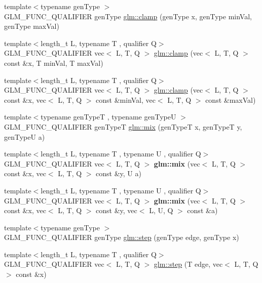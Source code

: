 \begin{DoxyCompactItemize}
\item 
{\footnotesize template$<$typename gen\+Type $>$ }\\G\+L\+M\+\_\+\+F\+U\+N\+C\+\_\+\+Q\+U\+A\+L\+I\+F\+I\+ER gen\+Type \hyperlink{group__core__func__common_ga93bce26c7d80d30a62f5c508f8498a6c}{glm\+::clamp} (gen\+Type x, gen\+Type min\+Val, gen\+Type max\+Val)
\item 
{\footnotesize template$<$length\+\_\+t L, typename T , qualifier Q$>$ }\\G\+L\+M\+\_\+\+F\+U\+N\+C\+\_\+\+Q\+U\+A\+L\+I\+F\+I\+ER vec$<$ L, T, Q $>$ \hyperlink{group__core__func__common_gabff13e6547edac08f52b4133ff4bf183}{glm\+::clamp} (vec$<$ L, T, Q $>$ const \&x, T min\+Val, T max\+Val)
\item 
{\footnotesize template$<$length\+\_\+t L, typename T , qualifier Q$>$ }\\G\+L\+M\+\_\+\+F\+U\+N\+C\+\_\+\+Q\+U\+A\+L\+I\+F\+I\+ER vec$<$ L, T, Q $>$ \hyperlink{group__core__func__common_ga748333282a6f2f87762c0a4739c8c364}{glm\+::clamp} (vec$<$ L, T, Q $>$ const \&x, vec$<$ L, T, Q $>$ const \&min\+Val, vec$<$ L, T, Q $>$ const \&max\+Val)
\item 
{\footnotesize template$<$typename gen\+TypeT , typename gen\+TypeU $>$ }\\G\+L\+M\+\_\+\+F\+U\+N\+C\+\_\+\+Q\+U\+A\+L\+I\+F\+I\+ER gen\+TypeT \hyperlink{group__core__func__common_ga8e93f374aae27d1a88b921860351f8d4}{glm\+::mix} (gen\+TypeT x, gen\+TypeT y, gen\+TypeU a)
\item 
{\footnotesize template$<$length\+\_\+t L, typename T , typename U , qualifier Q$>$ }\\G\+L\+M\+\_\+\+F\+U\+N\+C\+\_\+\+Q\+U\+A\+L\+I\+F\+I\+ER vec$<$ L, T, Q $>$ {\bfseries glm\+::mix} (vec$<$ L, T, Q $>$ const \&x, vec$<$ L, T, Q $>$ const \&y, U a)
\item 
{\footnotesize template$<$length\+\_\+t L, typename T , typename U , qualifier Q$>$ }\\G\+L\+M\+\_\+\+F\+U\+N\+C\+\_\+\+Q\+U\+A\+L\+I\+F\+I\+ER vec$<$ L, T, Q $>$ {\bfseries glm\+::mix} (vec$<$ L, T, Q $>$ const \&x, vec$<$ L, T, Q $>$ const \&y, vec$<$ L, U, Q $>$ const \&a)
\item 
{\footnotesize template$<$typename gen\+Type $>$ }\\G\+L\+M\+\_\+\+F\+U\+N\+C\+\_\+\+Q\+U\+A\+L\+I\+F\+I\+ER gen\+Type \hyperlink{group__core__func__common_ga015a1261ff23e12650211aa872863cce}{glm\+::step} (gen\+Type edge, gen\+Type x)
\item 
{\footnotesize template$<$length\+\_\+t L, typename T , qualifier Q$>$ }\\G\+L\+M\+\_\+\+F\+U\+N\+C\+\_\+\+Q\+U\+A\+L\+I\+F\+I\+ER vec$<$ L, T, Q $>$ \hyperlink{group__core__func__common_ga8f9a911a48ef244b51654eaefc81c551}{glm\+::step} (T edge, vec$<$ L, T, Q $>$ const \&x)

\end{DoxyCompactItemize}
